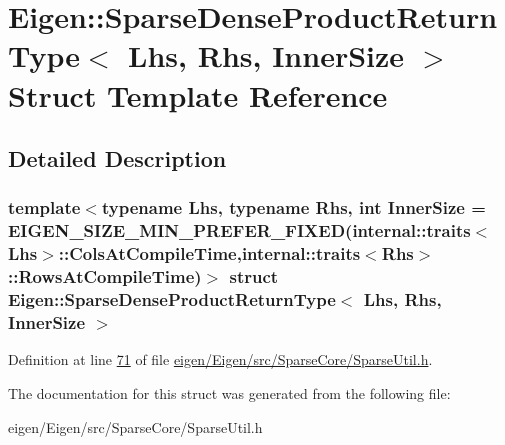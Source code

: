 \hypertarget{struct_eigen_1_1_sparse_dense_product_return_type}{}\section{Eigen\+:\+:Sparse\+Dense\+Product\+Return\+Type$<$ Lhs, Rhs, Inner\+Size $>$ Struct Template Reference}
\label{struct_eigen_1_1_sparse_dense_product_return_type}


\subsection{Detailed Description}
\subsubsection*{template$<$typename Lhs, typename Rhs, int Inner\+Size = E\+I\+G\+E\+N\+\_\+\+S\+I\+Z\+E\+\_\+\+M\+I\+N\+\_\+\+P\+R\+E\+F\+E\+R\+\_\+\+F\+I\+X\+E\+D(internal\+::traits$<$\+Lhs$>$\+::\+Cols\+At\+Compile\+Time,internal\+::traits$<$\+Rhs$>$\+::\+Rows\+At\+Compile\+Time)$>$\newline
struct Eigen\+::\+Sparse\+Dense\+Product\+Return\+Type$<$ Lhs, Rhs, Inner\+Size $>$}



Definition at line \hyperlink{eigen_2_eigen_2src_2_sparse_core_2_sparse_util_8h_source_l00071}{71} of file \hyperlink{eigen_2_eigen_2src_2_sparse_core_2_sparse_util_8h_source}{eigen/\+Eigen/src/\+Sparse\+Core/\+Sparse\+Util.\+h}.



The documentation for this struct was generated from the following file\+:\begin{DoxyCompactItemize}
\item 
eigen/\+Eigen/src/\+Sparse\+Core/\+Sparse\+Util.\+h\end{DoxyCompactItemize}
